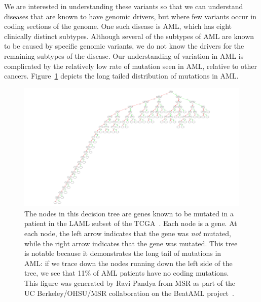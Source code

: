 \documentclass[11pt]{article} %
\begin{document}
We are interested in understanding these variants so that we can understand diseases that are
known to have genomic drivers, but where few variants occur in coding sections of the genome.
One such disease is AML, which has eight clinically distinct subtypes. Although several of the
subtypes of AML are known to be caused by specific genomic variants, we do not know the drivers
for the remaining subtypes of the disease. Our understanding of variation in AML is complicated
by the relatively low rate of mutation seen in AML, relative to other cancers.
Figure~\ref{fig:aml} depicts the long tailed distribution of mutations in AML.

\begin{figure}[h]
\begin{center}
\includegraphics[width=\linewidth]{aml.pdf}
\caption{The nodes in this decision tree are genes known to be mutated in a patient in the LAML
subset of the TCGA~\cite{cancer13}. Each node is a gene. At each node, the left arrow indicates
that the gene was \emph{not} mutated, while the right arrow indicates that the gene was mutated.
This tree is notable because it demonstrates the long tail of mutations in AML: if we trace down
the nodes running down the left side of the tree, we see that 11\% of AML patients have no coding
mutations. This figure was generated by Ravi Pandya from MSR as part of the UC Berkeley/OHSU/MSR
collaboration on the BeatAML project~\cite{paten15}.}
\label{fig:aml}
\end{center}
\end{figure}
\end{document}

